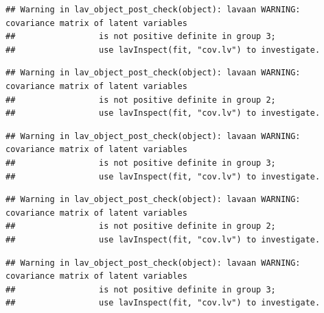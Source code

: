 \documentclass[
  english,
  man]{apa6}
\begin{document}
\begin{verbatim}
## Warning in lav_object_post_check(object): lavaan WARNING: covariance matrix of latent variables
##                 is not positive definite in group 3;
##                 use lavInspect(fit, "cov.lv") to investigate.
\end{verbatim}

\begin{verbatim}
## Warning in lav_object_post_check(object): lavaan WARNING: covariance matrix of latent variables
##                 is not positive definite in group 2;
##                 use lavInspect(fit, "cov.lv") to investigate.
\end{verbatim}

\begin{verbatim}
## Warning in lav_object_post_check(object): lavaan WARNING: covariance matrix of latent variables
##                 is not positive definite in group 3;
##                 use lavInspect(fit, "cov.lv") to investigate.
\end{verbatim}

\begin{verbatim}
## Warning in lav_object_post_check(object): lavaan WARNING: covariance matrix of latent variables
##                 is not positive definite in group 2;
##                 use lavInspect(fit, "cov.lv") to investigate.
\end{verbatim}

\begin{verbatim}
## Warning in lav_object_post_check(object): lavaan WARNING: covariance matrix of latent variables
##                 is not positive definite in group 3;
##                 use lavInspect(fit, "cov.lv") to investigate.
\end{verbatim}
\end{document}
